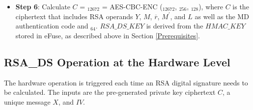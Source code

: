 \documentclass[main\_\_EN.tex]{subfiles}
\begin{document}
\begin{itemize}
    \item \label{Extract Cipher} {\bfseries Step 6}: Calculate \begin{math}C\end{math} = \begin{math}[C]_{12672}\end{math} =
            AES-CBC-ENC (\begin{math}[P]_{12672}\end{math}, \begin{math}[RSA\_DS\_KEY]_{256}\end{math}, \begin{math}[IV]_{128}\end{math}), where \begin{math}C\end{math} is the ciphertext that includes RSA operands \begin{math}Y\end{math},
                \begin{math}M\end{math}, \begin{math}\overline{r}\end{math},
                \begin{math}M^{\prime} \end{math}, and
                \begin{math}L\end{math} as well as the MD authentication code and \begin{math}[\beta]_{64} \end{math}. \begin{math}RSA\_DS\_KEY\end{math} is derived from the \begin{math}HMAC\_KEY\end{math} stored in eFuse, as described above in Section \ref{Prerequisites}.
\end{itemize}

\subsection{RSA\_DS Operation at the Hardware Level}\label{DS Operation at the Hardware Level}

The hardware operation is triggered each time an RSA digital signature needs to be calculated. The inputs are the pre-generated private key ciphertext \begin{math}C\end{math}, a unique message \begin{math}X\end{math}, and \begin{math}IV\end{math}.
\end{document}

